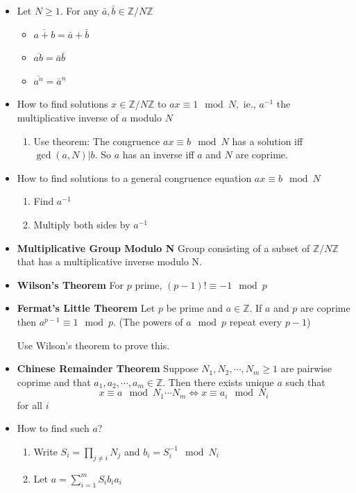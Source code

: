 \documentclass[a4paper, 12pt]
{article}
\begin{document}
\begin{itemize}
	\item Let $N\geq 1.$ For any $\bar{a}, \bar{b} \in \mathbb{Z}/ N\mathbb{Z}$
	\begin{itemize}
		\item $\overline{a+b} = \bar{a} + \bar{b}$
		\item $\overline{ab} = \bar{a}\bar{b}$
		\item $\overline{a^n}  = \bar{a}^n$
	\end{itemize}
	
	\item How to find solutions $x \in \mathbb{Z}/ N\mathbb{Z}$ to $ax \equiv 1 \mod N,$ ie., $a^{-1}$ the multiplicative inverse of $a$ modulo $N$
		\begin{enumerate}
		\item Use theorem: The congruence $ax \equiv b \mod N$ has a solution iff $\gcd(a,N)|b.$ So $a$ has an inverse iff $a$ and $N$ are coprime.
	\end{enumerate} 
	
	\item How to find solutions to a general congruence equation $ax \equiv b \mod N$
	\begin{enumerate}
		\item Find $a^{-1}$
		\item Multiply both sides by $a^{-1}$
	\end{enumerate}
	
	\item \textbf{Multiplicative Group Modulo N} Group consisting of a subset of $\mathbb{Z}/ N\mathbb{Z}$  that has a multiplicative inverse modulo N.
	
	\item \textbf{Wilson's Theorem} For $p$ prime, $(p-1)!  \equiv -1 \mod p$
	
	\item \textbf{Fermat's Little Theorem} Let $p$ be prime and $a \in \mathbb{Z}.$ If $a$ and $p$ are coprime then $a^{p-1} \equiv 1 \mod p.$ (The powers of $a \mod p$ repeat every $p-1$)
	
	Use Wilson's theorem to prove this.
	
	\item \textbf{Chinese Remainder Theorem} Suppose $N_1, N_2, \cdots, N_m \geq 1$ are pairwise coprime and that $a_1, a_2, \cdots, a_m \in \mathbb{Z}.$ Then there exists unique $a$ such that 
	$$x \equiv a \mod N_1 \cdots N_m \iff x \equiv a_i \mod N_i$$ for all $i$
	
	\item How to find such $a$?
	\begin{enumerate}
		\item Write $S_i = \prod_{j \not=i}N_j$ and $b_i = S_i^{-1} \mod N_i$
		\item Let $a = \sum_{i=1}^{m} S_ib_ia_i$
	\end{enumerate}
\end{itemize}
\end{document}
